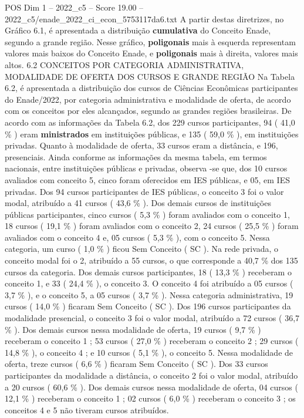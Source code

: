 \begin{textsample}{POS Dim 1 – 2022\_c5 – Score 19.00 – 2022\_c5/enade\_2022\_ci\_econ\_5753117da6.txt}
A partir destas diretrizes, no Gráfico 6.1, é apresentada a distribuição \textbf{cumulativa} do Conceito Enade, segundo a grande região.
Nesse gráfico, \textbf{poligonais} mais à esquerda representam valores mais baixos do Conceito Enade, e \textbf{poligonais} mais à direita, valores mais altos. 6.2 CONCEITOS POR CATEGORIA ADMINISTRATIVA, MODALIDADE DE OFERTA DOS CURSOS E GRANDE REGIÃO Na Tabela 6.2, é apresentada a distribuição dos cursos de Ciências Econômicas participantes do Enade/2022, por categoria administrativa e modalidade de oferta, de acordo com os conceitos por eles alcançados, segundo as grandes regiões brasileiras.
De acordo com as informações da Tabela 6.2, dos 229 cursos participantes, 94 ( 41,0 \% ) eram \textbf{ministrados} em instituições públicas, e 135 ( 59,0 \% ), em instituições privadas.
Quanto à modalidade de oferta, 33 cursos eram a distância, e 196, presenciais.
Ainda conforme as informações da mesma tabela, em termos nacionais, entre instituições públicas e privadas, observa -se que, dos 10 cursos avaliados com conceito 5, cinco foram oferecidos em IES públicas, e 05, em IES privadas.
Dos 94 cursos participantes de IES públicas, o conceito 3 foi o valor modal, atribuído a 41 cursos ( 43,6 \% ).
Dos demais cursos de instituições públicas participantes, cinco cursos ( 5,3 \% ) foram avaliados com o conceito 1, 18 cursos ( 19,1 \% ) foram avaliados com o conceito 2, 24 cursos ( 25,5 \% ) foram avaliados com o conceito 4 e, 05 cursos ( 5,3 \% ), com o conceito 5.
Nessa categoria, um curso ( 1,0 \% ) ficou Sem Conceito ( SC ).
Na rede privada, o conceito modal foi o 2, atribuído a 55 cursos, o que corresponde a 40,7 \% dos 135 cursos da categoria.
Dos demais cursos participantes, 18 ( 13,3 \% ) receberam o conceito 1, e 33 ( 24,4 \% ), o conceito 3.
O conceito 4 foi atribuído a 05 cursos ( 3,7 \% ), e o conceito 5, a 05 cursos ( 3,7 \% ).
Nessa categoria administrativa, 19 cursos ( 14,0 \% ) ficaram Sem Conceito ( SC ).
Dos 196 cursos participantes da modalidade presencial, o conceito 3 foi o valor modal, atribuído a 72 cursos ( 36,7 \% ).
Dos demais cursos nessa modalidade de oferta, 19 cursos ( 9,7 \% ) receberam o conceito 1 ; 53 cursos ( 27,0 \% ) receberam o conceito 2 ; 29 cursos ( 14,8 \% ), o conceito 4 ; e 10 cursos ( 5,1 \% ), o conceito 5.
Nessa modalidade de oferta, treze cursos ( 6,6 \% ) ficaram Sem Conceito ( SC ).
Dos 33 cursos participantes da modalidade a distância, o conceito 2 foi o valor modal, atribuído a 20 cursos ( 60,6 \% ).
Dos demais cursos nessa modalidade de oferta, 04 cursos ( 12,1 \% ) receberam o conceito 1 ; 02 cursos ( 6,0 \% ) receberam o conceito 3 ; os conceitos 4 e 5 não tiveram cursos atribuídos.

\end{textsample}
